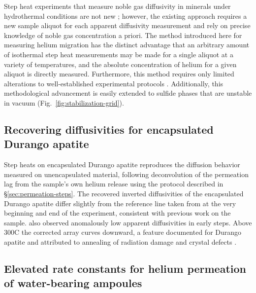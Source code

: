 Step heat experiments that measure noble gas diffusivity in minerals under hydrothermal conditions are not new \citep{harrison1982,harrison1985}; however, the existing approach requires a new sample aliquot for each apparent diffusivity measurement and rely on precise knowledge of noble gas concentration a priori. The method introduced here for measuring helium migration has the distinct advantage that an arbitrary amount of isothermal step heat measurements may be made for a single aliquot at a variety of temperatures, and the absolute concentration of helium for a given aliquot is directly measured. Furthermore, this method requires only limited alterations to well-established experimental protocols \citep{farley1999}. Additionally, this methodological advancement is easily extended to sulfide phases that are unstable in vacuum (Fig.~\ref{fig:stabilization-grid}).



\subsection{Recovering diffusivities for encapsulated Durango apatite}\label{sec:recover-arrhenius}
Step heats on encapsulated Durango apatite reproduces the diffusion behavior measured on unencapsulated material, following deconvolution of the permeation lag from the sample's own helium release using the protocol described in \S\ref{sec:permeation-steps}. 
The recovered inverted diffusivities of the encapsulated Durango apatite differ slightly from the reference line taken from \citet{farley2000} at the very beginning and end of the experiment, consistent with previous work on the sample. \citet{farley2000} also observed anomalously low apparent diffusivities in early steps. Above 300\textdegree C the corrected array curves downward, a feature documented for Durango apatite and attributed to annealing of radiation damage and crystal defects \citep{wolf1996,farley2000,shuster2006}. 

\subsection{Elevated rate constants for helium permeation of water-bearing ampoules}\label{sec:discussion-rate-constant}

